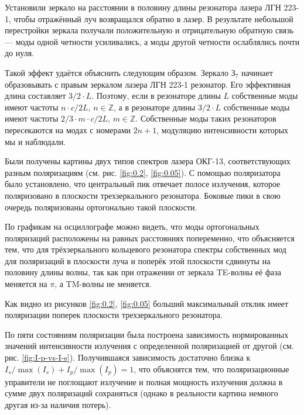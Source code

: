 \documentclass[12pt, russian, a4paper]{article}
\begin{document}
	Установили зеркало на расстоянии в половину длины резонатора лазера ЛГН 223-1, чтобы отражённый луч возвращался обратно в лазер. В результате небольшой перестройки зеркала получали положительную и отрицательную обратную связь --- моды одной четности усиливались, а моды другой четности ослаблялись почти до нуля.

	Такой эффект удаётся объяснить следующим образом. Зеркало $\text{З}_7$ начинает образовывать с правым зеркалом лазера ЛГН 223-1 резонатор. Его эффективная длина составляет $3/2 \cdot L$. Поэтому, если в резонаторе длины $L$ собственные моды имеют частоты $n \cdot c/2L,\,n\in\mathbb{Z}$, а в резонаторе длины $3/2\cdot L$ собственные моды имеют частоты $2/3\cdot m \cdot c/2L,\,m\in\mathbb{Z}$. Собственные моды таких резонаторов пересекаются на модах с номерами $2n+1$, модуляцию интенсивности которых мы и наблюдали.


	Были получены картины двух типов спектров лазера ОКГ-13, соответствующих разным поляризациям (см. рис. \ref{fig:0.2}, \ref{fig:0.05}). С помощью поляризатора было установлено, что центральный пик отвечает полосе излучения, которое поляризовано в плоскости трехзеркального резонатора. Боковые пики в свою очередь поляризованы ортогонально такой плоскости.

	По графикам на осциллографе можно видеть, что моды ортогональных поляризаций расположены на равных расстояниях попеременно, что объясняется тем, что для трёхзеркального кольцевого резонатора спектры собственных мод для поляризаций в плоскости луча и поперёк этой плоскости сдвинуты на половину длины волны, так как при отражении от зеркала TE-волны её фаза меняется на $\pi$, а TM-волны не меняется.

	Как видно из рисунков \ref{fig:0.2}, \ref{fig:0.05} больший максимальный отклик имеет поляризации поперек плоскости трехзеркального резонатора.

	По пяти состояниям поляризации была построена зависимость нормированных значений интенсивности излучения с определенной поляризацией от другой (см. рис. \ref{fig:I-p-vs-I-s}). Получившаяся зависимость достаточно близка к $I_s/\max(I_s) + I_p/\max(I_p) = 1$, что объяснятся тем, что поляризационные управители не поглощают излучение и полная мощность излучения должна в сумме двух поляризаций сохраняться (однако в реальности картина немного другая из-за наличия потерь). 
\end{document}
